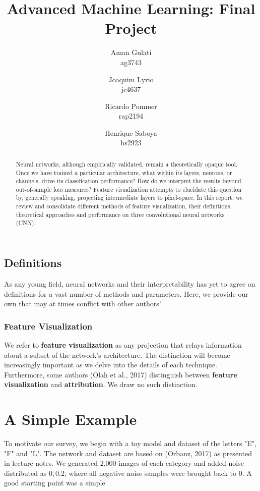 \documentclass[12pt]{article}
\title{Advanced Machine Learning: Final Project}
\author{
	Aman Gulati \\
	ag3743 \\
	\and 
	Joaquim Lyrio  \\
	jc4637 \\
	\and 
	Ricardo Pommer \\
	rap2194 \\
	\and
	Henrique Saboya \\
	hs2923 \\
}
\begin{document}
\maketitle

\begin{abstract}
	Neural networks, although empirically validated, remain a theoretically opaque tool. Once we have trained a particular architecture, what within its layers, neurons, or channels, drive its classification performance? How do we interpret the results beyond out-of-sample loss measures? Feature visualization attempts to elucidate this question by, generally speaking, projecting intermediate layers to pixel-space. In this report,  we review and consolidate different methods of feature visualization, their definitions, theoretical approaches and performance on three convolutional neural networks (CNN).
\end{abstract}

\subsection{Definitions}
As any young field, neural networks and their interpretability has yet to agree on definitions for a vast number of methods and parameters. Here, we provide our own that may at times conflict with other authors'.

\subsubsection{Feature Visualization}
We refer to \textbf{feature visualization} as any projection that relays information about a subset of the network's architecture. The distinction will become increasingly important as we delve into the details of each technique. Furthermore, some authors (Olah et al., 2017) distinguish between \textbf{feature visualization} and \textbf{attribution}. We draw no such distinction.

\section{A Simple Example}
To motivate our survey, we begin with a toy model and dataset of the letters "E", "F" and "L". The network and dataset are based on (Orbanz, 2017) as presented in lecture notes. We generated 2,000 images of each category and added noise distributed as $\mathcal{0, 0.2}$, where all negative noise samples were brought back to 0. A good starting point was a simple 
\end{document}
